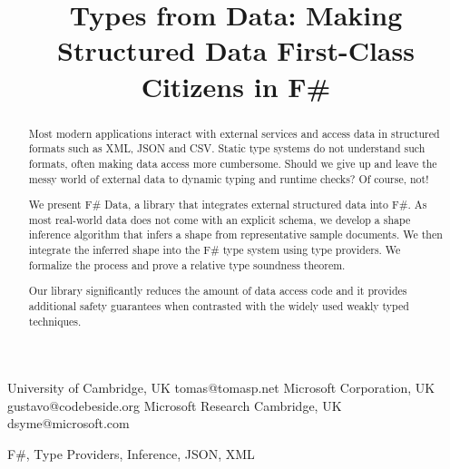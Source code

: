 \documentclass[pldi-cameraready]{sigplanconf-pldi16}
\begin{document}

\title{Types from Data: Making Structured Data First-Class Citizens in F\#}

           {University of Cambridge, UK}
           {tomas@tomasp.net}
           {Microsoft Corporation, UK}
           {gustavo@codebeside.org}
           {Microsoft Research Cambridge, UK}
           {dsyme@microsoft.com}
\maketitle


\begin{abstract}
Most modern applications interact with external services and access data in structured formats such
as XML, JSON and CSV. Static type systems do not understand such formats, often making data access
more cumbersome. Should we give up and leave the messy world of external data to dynamic typing
and runtime checks? Of course, not!

We present F\# Data, a library that integrates external structured data into F\#. As most real-world
data does not come with an explicit schema, we develop a shape inference algorithm that infers a
shape from representative sample documents. We then integrate the inferred shape into the F\# type
system using type providers. We formalize the process and prove a relative type soundness theorem.

Our library significantly reduces the amount of data access code and it provides additional
safety guarantees when contrasted with the widely used weakly typed techniques.
\end{abstract}

\keywords F\#, Type Providers, Inference, JSON, XML



%
%
\end{document}
